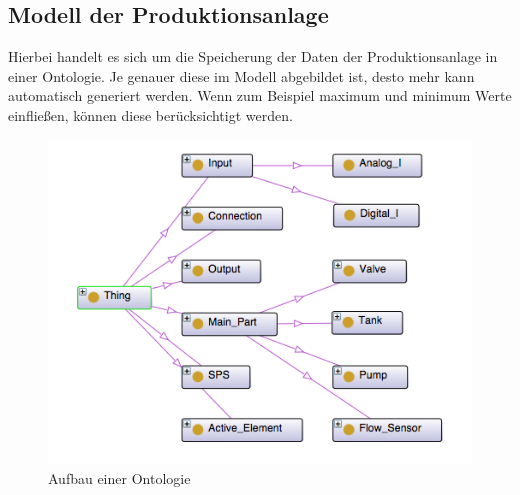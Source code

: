 \subsection{Modell der Produktionsanlage}
Hierbei handelt es sich um die Speicherung der Daten der Produktionsanlage in einer Ontologie. Je genauer diese im Modell abgebildet ist, desto mehr kann automatisch generiert werden. Wenn zum Beispiel maximum und minimum Werte einfließen, können diese berücksichtigt werden.
\begin{figure}[hbt!]
 \centering
  \includegraphics[width=1\textwidth]{graphics/stateoftheart/Ontology_Aufbau}
  \caption{Aufbau einer Ontologie}
\end{figure}
